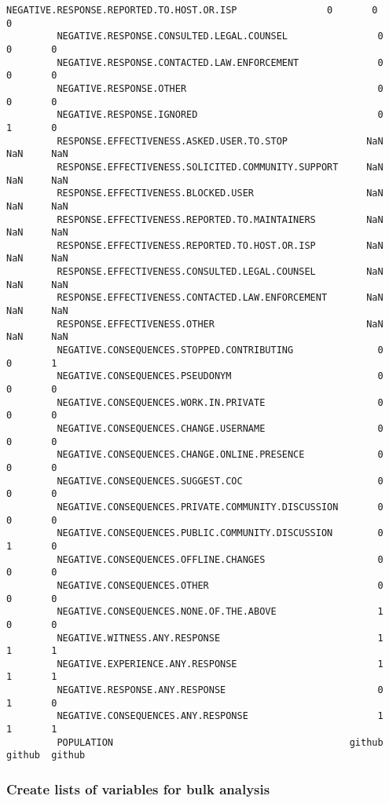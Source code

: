 \documentclass[11pt]{article}
\begin{document}
\begin{Verbatim}[commandchars=\\\{\}]
         NEGATIVE.RESPONSE.REPORTED.TO.HOST.OR.ISP                0       0       0
         NEGATIVE.RESPONSE.CONSULTED.LEGAL.COUNSEL                0       0       0
         NEGATIVE.RESPONSE.CONTACTED.LAW.ENFORCEMENT              0       0       0
         NEGATIVE.RESPONSE.OTHER                                  0       0       0
         NEGATIVE.RESPONSE.IGNORED                                0       1       0
         RESPONSE.EFFECTIVENESS.ASKED.USER.TO.STOP              NaN     NaN     NaN
         RESPONSE.EFFECTIVENESS.SOLICITED.COMMUNITY.SUPPORT     NaN     NaN     NaN
         RESPONSE.EFFECTIVENESS.BLOCKED.USER                    NaN     NaN     NaN
         RESPONSE.EFFECTIVENESS.REPORTED.TO.MAINTAINERS         NaN     NaN     NaN
         RESPONSE.EFFECTIVENESS.REPORTED.TO.HOST.OR.ISP         NaN     NaN     NaN
         RESPONSE.EFFECTIVENESS.CONSULTED.LEGAL.COUNSEL         NaN     NaN     NaN
         RESPONSE.EFFECTIVENESS.CONTACTED.LAW.ENFORCEMENT       NaN     NaN     NaN
         RESPONSE.EFFECTIVENESS.OTHER                           NaN     NaN     NaN
         NEGATIVE.CONSEQUENCES.STOPPED.CONTRIBUTING               0       0       1
         NEGATIVE.CONSEQUENCES.PSEUDONYM                          0       0       0
         NEGATIVE.CONSEQUENCES.WORK.IN.PRIVATE                    0       0       0
         NEGATIVE.CONSEQUENCES.CHANGE.USERNAME                    0       0       0
         NEGATIVE.CONSEQUENCES.CHANGE.ONLINE.PRESENCE             0       0       0
         NEGATIVE.CONSEQUENCES.SUGGEST.COC                        0       0       0
         NEGATIVE.CONSEQUENCES.PRIVATE.COMMUNITY.DISCUSSION       0       0       0
         NEGATIVE.CONSEQUENCES.PUBLIC.COMMUNITY.DISCUSSION        0       1       0
         NEGATIVE.CONSEQUENCES.OFFLINE.CHANGES                    0       0       0
         NEGATIVE.CONSEQUENCES.OTHER                              0       0       0
         NEGATIVE.CONSEQUENCES.NONE.OF.THE.ABOVE                  1       0       0
         NEGATIVE.WITNESS.ANY.RESPONSE                            1       1       1
         NEGATIVE.EXPERIENCE.ANY.RESPONSE                         1       1       1
         NEGATIVE.RESPONSE.ANY.RESPONSE                           0       1       0
         NEGATIVE.CONSEQUENCES.ANY.RESPONSE                       1       1       1
         POPULATION                                          github  github  github
\end{Verbatim}
        
    \subsubsection{Create lists of variables for bulk
analysis}\label{create-lists-of-variables-for-bulk-analysis}
\end{document}
